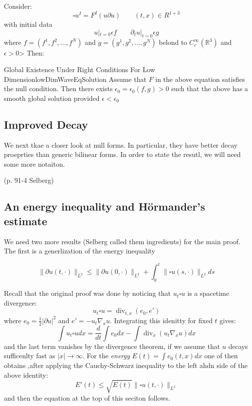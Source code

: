 \documentclass{book}
\newcommand{\R}{{\mathbb{R}}}
\newcommand{\rw}{\rightarrow}
\begin{document}
Consider:
\[
	\square u^I = F^I(u  \partial u) \qquad (t,x) \in R^{1+3}
\]
with initial data
\[
	u|_{t = 0} \epsilon f \qquad  \partial_t u|_{t = 0} \epsilon g
\]
where $f = (f^1, f^2, ..., f^N)$ and $g = (g^1, g^2, ..., g^N)$ belond to $C_c^\infty(\R^3)$ and $\epsilon > 0$> Then:

\begin{thm}{Global Existence Under Right Conditions For Low Dimension}{lowDimWaveEqSolution}
	Assume that $F$ in the above equation satisfies the null condition. Then there exists $\epsilon_0
	= \epsilon_0(f,g) > 0$ such that the above has a smooth global solution provided $\epsilon < \epsilon_0$
\end{thm}

\subsection{Improved Decay}

We next tkae a closer look at null forms. In particular, they have better decay proeprties than generic bilinear
forms. In order to state the resutl, we will need some more notaiton.

(p. 91-4 Selberg)

\subsection{An energy inequality and H\"ormander's estimate}

We need two more results (Selberg called them ingredients) for the main proof. The first is a generlization of the
energy inequality

\begin{equation}\label{eq:engInequGeneralization}
	\|  \partial u(t, \cdot)\|_{L^2} \le \|  \partial u(0, \cdot)\|_{L^2} + \int_0^t \|\square u(s,
	\cdot)\|_{L^2} ds
\end{equation}

Recall that the original proof was done by noticing that $u_t \square u$ is a spacetime divergence:
\begin{equation}\label{eq:genEnergIneq}
  u_t \square u = \operatorname{div}_{t,x}(e_0, e')
\end{equation}
where $e_0 = \frac{1}{2} |  \partial u|^2$ and $e' = -u_t\nabla_x u$. Integrating this idenitty for fixed $t$
gives:
\[
	\int u_t\square u dx = \frac{d}{dt} \int e_0 dx - \int \operatorname{div}_x (u_t \nabla_x u)dx
\]
and the last term vanishes by the divergence theorem, if we assume that $u$ decays sufficenlty fast as $|x| \rw
\infty$. For the \emph{energy} $E(t) = \int e_0(t,x)dx$ one of then obtains ,after applying the Cauchy-Schwarz
inequality to the left ahdn side of the above identity:
\[
	E'(t) \le \sqrt{E(t)} \|\square u(t, \cdot)\|_{L^2}
\]
and then the equation at the top of this seciton follows.
\end{document}
